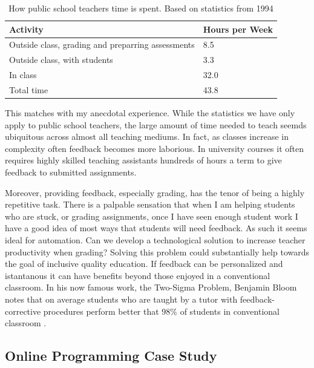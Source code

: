 \begin{table}[h]
 \centering
 \begin{tabular}{ l l }
 \toprule
	Activity & Hours per Week \\
   \midrule
   Outside class, grading and preparring assessments & 8.5 \\
  Outside class, with students & 3.3 \\
  In class & 32.0 \\
  Total time & 43.8 \\
  \bottomrule
  \end{tabular}
  \caption[Teacher time]{How public school teachers time is spent. Based on statistics from 1994 \cite{henke1996schools}}
 \label{tab:dataTable}
\end{table}

This matches with my anecdotal experience. While the statistics we have only apply to public school teachers, the large amount of time needed to teach seemds ubiquitous across almost all teaching mediums. In fact, as classes increase in complexity often feedback becomes more laborious. In university courses it often requires highly skilled teaching assistants hundreds of hours a term to give feedback to submitted assignments.

Moreover, providing feedback, especially grading, has the tenor of being a highly repetitive task. There is a palpable sensation that when I am helping students who are stuck, or grading assignments, once I have seen enough student work I have a good idea of most ways that students will need feedback. As such it seems ideal for automation. Can we develop a technological solution to increase teacher productivity when grading? Solving this problem could substantially help towards the goal of inclusive quality education. If feedback can be personalized and istantanous it can have benefits beyond those enjoyed in a conventional classroom. In his now famous work, the Two-Sigma Problem, Benjamin Bloom notes that on average students who are taught by a tutor with feedback-corrective procedures perform better that 98\% of students in conventional classroom \cite{corbett2001cognitive}.

\subsection{Online Programming Case Study}

